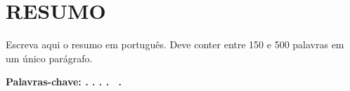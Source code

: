 \chapter*{RESUMO}

{\fontsize{12pt}{14pt}\selectfont%
    Escreva aqui o resumo em português. Deve conter entre 150 e 500 palavras em um único parágrafo.%
\par}

\vspace{0.5cm}

{\fontsize{12pt}{14pt}\bfseries\selectfont%
    Palavras-chave: %
    \fontsize{12pt}{14pt}\selectfont%
    \palavrachaveum. \palavrachavedois. \palavrachavetres. \palavrachavequatro.%
    \ifx\palavrachavecinco\empty\else
        \ \palavrachavecinco.%
    \fi
\par}